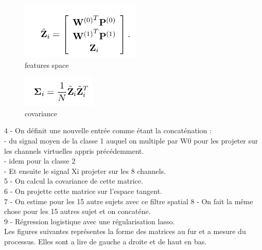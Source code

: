 \documentclass{article}
\begin{document}
\begin{figure}[H]
\begin{center}
\includegraphics[scale=0.8]{images/features_space.png}
\end{center}
\caption{features space}
\end{figure}

\begin{figure}[H]
\begin{center}
\includegraphics[scale=0.8]{images/covariance.png}
\end{center}
\caption{covariance}
\end{figure}


4 - On définit une nouvelle entrée comme étant la concaténation :\\
- du signal moyen de la classe 1 auquel on multiple par W0 pour les projeter sur les channels virtuelles appris précédemment.\\
- idem pour la classe 2\\
- Et ensuite le signal Xi projeter sur les 8 channels.\\
5 - On calcul la covariance de cette matrice.\\
6 - On projette cette matrice sur l'espace tangent.\\
7 - On estime pour les 15 autre sujets avec ce filtre spatial
8 - On fait la même chose pour les 15 autres sujet et on concaténe.\\
9 - Régression logistique avec une régularisation lasso.\\
Les figures suivantes représentes la forme des matrices au fur et a mesure du processus. Elles sont a lire de gauche a droite et de haut en bas.
\\
\end{document}
